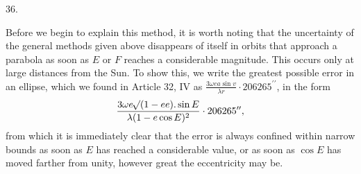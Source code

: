 \par{}
\begin{center}
\hypertarget{native-053-article036}{}36.
\end{center}
Before we begin to explain this method, it is worth noting that the uncertainty of the general methods given above disappears of itself in orbits that approach a parabola as soon as $E$ or $F$ reaches a considerable magnitude. This occurs only at large distances from the Sun. To show this, we write the greatest possible error in an ellipse, which we found in Article 32, IV as $\frac{3\omega ea\sin v}{\lambda r}\cdot206265^{\prime\prime}$, in the form
\[
\frac{3\omega e\mathord{{}^{}\!\surd}(1-ee).\sin E}{\lambda(1-e\cos E)^2}\cdot206265^{\prime\prime},
\]
from which it is immediately clear that the error is always confined within narrow bounds as soon as $E$ has reached a considerable value, or as soon as $\cos E$ has moved farther from unity, however great the eccentricity may be.

